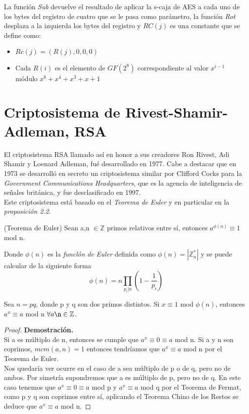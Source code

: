 La función \emph{Sub} devuelve el resultado de aplicar la s-caja de AES a cada uno de los bytes del registro de cuatro que se le pasa como parámetro, la función \emph{Rot} desplaza a la izquierda los bytes del registro y $RC(j)$ es una constante que se define como:
\begin{itemize}
	\item $Rc(j)=(R(j),0,0,0)$
	\item Cada $R(i)$ es el elemento de $GF(2^8)$ correspondiente al valor $x^{i-1}$ módulo $x^8+x^4+x^3+x+1$
\end{itemize}

\section{Criptosistema de Rivest-Shamir-Adleman, RSA}
El criptosistema RSA llamado así en honor a sus creadores Ron Rivest, Adi Shamir y Loenard Adleman, fué desarrollado en 1977. Cabe a destacar que en 1973 se desarrolló en secreto un criptosistema similar por Clifford Cocks para la \emph{Government Communications Headquarters}, que es la agencia de inteligencia de señales británica, y fue desclasificado en 1997\cite{cliffordCocks}.\\
Este criptosistema está basado en el \emph{Teorema de Euler} y en particular en la \emph{proposición 2.2}.
\begin{teorema}
	(Teorema de Euler) Sean a,n $\in \mathbb{Z}$ primos relativos entre sí, entonces $a^{\phi(n)}\equiv 1$ mod n.
\end{teorema}
Donde $\phi(n)$ es la \emph{funclón de Euler} definida como $\phi(n)=|\mathbb{Z}^*_n|$ y se puede calcular de la siguiente forma $$\phi(n)=n\prod_{p_i|n}(1-\frac{1}{p_i})$$


\begin{proposicion}
	Sea $n = pq$, donde p y q son dos primos distintos. Si $x\equiv 1$ mod $\phi(n)$, entonces $a^x\equiv a$ mod n $\forall a \n \in \mathbb{Z}$.\\
	\begin{proof}
		\textbf{Demostración.}\\
		Si a es múltiplo de n, entonces se cumple que $a^x \equiv 0 \equiv a$ mod n. Si a y n son coprimos, $mcm(a,n) = 1$ entonces tendríamos que $a^x \equiv a$ mod n por el Teorema de Euler.\\
		Nos quedaría ver ocurre en el caso de a sea múltiplo de p o de q, pero no de ambos. Por simetría supondremos que a es múltiplo de p, pero no de q. En este caso tenemos que $a^x \equiv 0 \equiv a$ mod p  y $a^x \equiv a$ mod q por el Teorema de Fermat, como p y q son coprimos entre sí, aplicando el Teorema Chino de los Restos se deduce que $a^x \equiv a$ mod n. \blacksquare
	\end{proof}
\end{proposicion}

